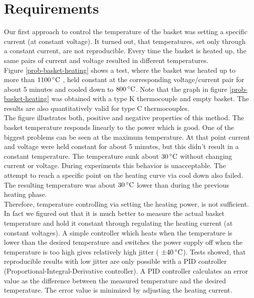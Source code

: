 \documentclass[parskip,12pt,headsepline,a4paper] {scrbook}
\begin{document}
\section{Requirements}
\label{chap:requirements}
\vspace{-0.5\baselineskip}
Our first approach to control the temperature of the basket was setting a specific current (at constant voltage). It turned out, that temperatures, set only through a constant current, are not reproducible. Every time the basket is heated up, the same pairs of current and voltage resulted in different temperatures. \\
Figure \ref{prob-basket-heating} shows a test, where the basket was heated up to more than $\unit[1100]{^\circ C}$ , held constant at the corresponding voltage/current pair for about 5 minutes and cooled down to $\unit[800]{^\circ C}$. Note that the graph in figure \ref{prob-basket-heating} was obtained with a type K thermocouple and empty basket. The results are also quantitatively valid for type C thermocouples. \\
The figure illustrates both, positive and negative properties of this method. The basket temperature responds linearly to the power which is good. One of the biggest problems can be seen at the maximum temperature. At that point current and voltage were held constant for about 5 minutes, but this didn't result in a constant temperature. The temperature sunk about $\unit[30]{^\circ C}$ without changing current or voltage. During experiments this behavior is unacceptable.
The attempt to reach a specific point on the heating curve via cool down also failed. The resulting temperature was about $\unit[30]{^\circ C}$ lower than during the previous heating phase. \\
Therefore, temperature controlling via setting the heating power, is not sufficient. In fact we figured out that it is much better to measure the actual basket temperature and hold it constant through regulating the heating current (at constant voltages). A simple controller which heats when the temperature is lower than the desired temperature and switches the power supply off when the temperature is too high gives relatively high jitter ( $\pm \unit[40]{^\circ C}$). Tests showed, that reproducible results with low jitter are only possible with a PID controller (Proportional-Integral-Derivative controller). A PID controller calculates an error value as the difference between the measured temperature and the desired temperature. The error value is minimized by adjusting the heating current.
\end{document}
